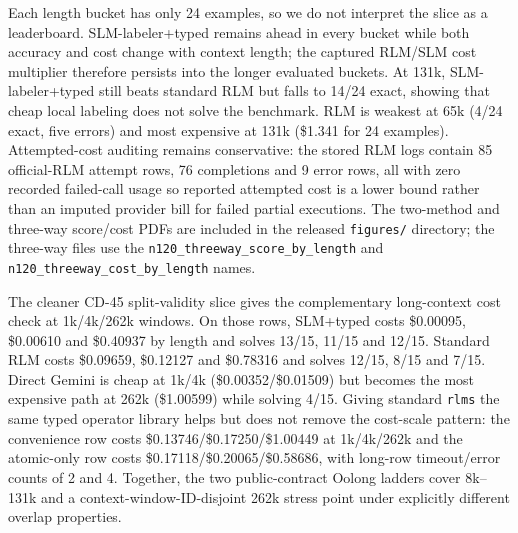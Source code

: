 \documentclass[letterpaper]{article}
\begin{document}
Each length bucket has only 24 examples, so we do not interpret the slice as a leaderboard. SLM-labeler+typed remains ahead in every bucket while both accuracy and cost change with context length; the captured RLM/SLM cost multiplier therefore persists into the longer evaluated buckets. At 131k, SLM-labeler+typed still beats standard RLM but falls to 14/24 exact, showing that cheap local labeling does not solve the benchmark. RLM is weakest at 65k (4/24 exact, five errors) and most expensive at 131k (\$1.341 for 24 examples). Attempted-cost auditing remains conservative: the stored RLM logs contain 85 official-RLM attempt rows, 76 completions and 9 error rows, all with zero recorded failed-call usage so reported attempted cost is a lower bound rather than an imputed provider bill for failed partial executions. The two-method and three-way score/cost PDFs are included in the released \texttt{figures/} directory; the three-way files use the \texttt{n120\_threeway\_score\_by\_length} and \texttt{n120\_threeway\_cost\_by\_length} names.

The cleaner CD-45 split-validity slice gives the complementary long-context cost check at 1k/4k/262k windows. On those rows, SLM+typed costs \$0.00095, \$0.00610 and \$0.40937 by length and solves 13/15, 11/15 and 12/15. Standard RLM costs \$0.09659, \$0.12127 and \$0.78316 and solves 12/15, 8/15 and 7/15. Direct Gemini is cheap at 1k/4k (\$0.00352/\$0.01509) but becomes the most expensive path at 262k (\$1.00599) while solving 4/15. Giving standard \texttt{rlms} the same typed operator library helps but does not remove the cost-scale pattern: the convenience row costs \$0.13746/\$0.17250/\$1.00449 at 1k/4k/262k and the atomic-only row costs \$0.17118/\$0.20065/\$0.58686, with long-row timeout/error counts of 2 and 4. Together, the two public-contract Oolong ladders cover 8k--131k and a context-window-ID-disjoint 262k stress point under explicitly different overlap properties.
\end{document}
